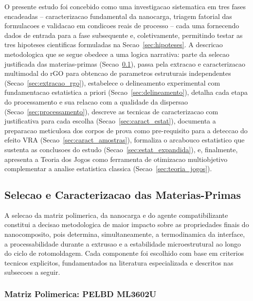 \documentclass[11pt,a4paper,oneside]{article}
\begin{document}

O presente estudo foi concebido como uma investigacao sistematica em tres fases encadeadas --
caracterizacao fundamental da nanocarga, triagem fatorial das formulacoes e validacao em
condicoes reais de processo -- cada uma fornecendo dados de entrada para a fase subsequente
e, coletivamente, permitindo testar as tres hipoteses cientificas formuladas na
Secao~\ref{sec:hipoteses}. A descricao metodologica que se segue obedece a uma logica
narrativa: parte da selecao justificada das materias-primas (Secao~\ref{sec:sel_materiais}),
passa pela extracao e caracterizacao multimodal do rGO para obtencao de parametros estruturais
independentes (Secao~\ref{sec:extracao_rgo}), estabelece o delineamento experimental com
fundamentacao estatistica a priori (Secao~\ref{sec:delineamento}), detalha cada etapa do
processamento e sua relacao com a qualidade da dispersao (Secao~\ref{sec:processamento}),
descreve as tecnicas de caracterizacao com justificativa para cada escolha
(Secao~\ref{sec:caract_estat}), documenta a preparacao meticulosa dos corpos de prova como
pre-requisito para a deteccao do efeito VRA (Secao~\ref{sec:caract_amostras}), formaliza o
arcabouco estatistico que sustenta as conclusoes do estudo (Secao~\ref{sec:estat_expandida}),
e, finalmente, apresenta a Teoria dos Jogos como ferramenta de otimizacao multiobjetivo
complementar a analise estatistica classica (Secao~\ref{sec:teoria_jogos}).

\subsection{Selecao e Caracterizacao das Materias-Primas}\label{sec:sel_materiais}

A selecao da matriz polimerica, da nanocarga e do agente compatibilizante constitui a decisao
metodologica de maior impacto sobre as propriedades finais do nanocomposito, pois determina,
simultaneamente, a termodinamica da interface, a processabilidade durante a extrusao e a
estabilidade microestrutural ao longo do ciclo de rotomoldagem. Cada componente foi escolhido
com base em criterios tecnicos explicitos, fundamentados na literatura especializada e descritos
nas subsecoes a seguir.

\subsubsection{Matriz Polimerica: PELBD ML3602U}
\end{document}
